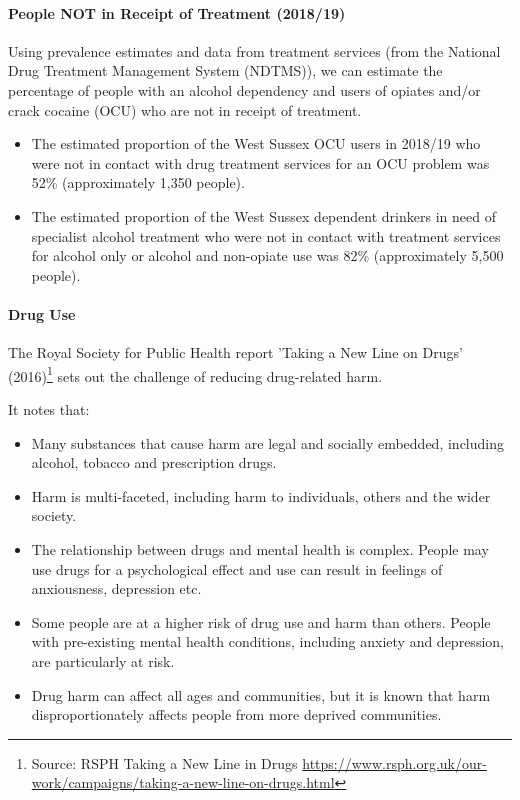 \paragraph{People NOT in Receipt of Treatment (2018/19)} Using prevalence estimates and data from treatment services (from the National Drug Treatment Management System (NDTMS)), we can estimate the percentage of people with an alcohol dependency and users of opiates and/or crack cocaine (OCU) who are not in receipt of treatment.

\begin{itemize}[noitemsep]
    \item The estimated proportion of the West Sussex OCU users in 2018/19 who were not in contact with drug treatment services for an OCU problem was 52\% (approximately 1,350 people).
    \item The estimated proportion of the West Sussex dependent drinkers in need of specialist alcohol treatment who were not in contact with treatment services for alcohol only or alcohol and non-opiate use was 82\% (approximately 5,500 people).
\end{itemize}
 
\paragraph{Drug Use} The Royal Society for Public Health report 'Taking a New Line on Drugs' (2016)\footnote{Source: RSPH Taking a New Line in Drugs \url{https://www.rsph.org.uk/our-work/campaigns/taking-a-new-line-on-drugs.html}} sets out the challenge of reducing drug-related harm.

It notes that:

\begin{itemize}[noitemsep]
    \item Many substances that cause harm are legal and socially embedded, including alcohol, tobacco and prescription drugs.
    \item Harm is multi-faceted, including harm to individuals, others and the wider society.
    \item The relationship between drugs and mental health is complex. People may use drugs for a psychological effect and use can result in feelings of anxiousness, depression etc.
    \item Some people are at a higher risk of drug use and harm than others. People with pre-existing mental health conditions, including anxiety and depression, are particularly at risk.
    \item Drug harm can affect all ages and communities, but it is known that harm disproportionately affects people from more deprived communities.
\end{itemize}


